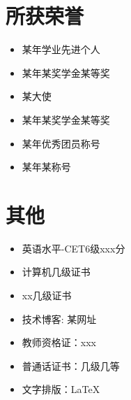 \documentclass[11pt]{article}
\begin{document}
    \section{\makebox[\widthof{\faStar}][c]{\color{NPU_Blue}{\faStar}}\quad 所获荣誉}
    \vspace{-1em}
    \begin{multicols}{2}
        \begin{itemize}
            \item 某年学业先进个人
            \item 某年某奖学金某等奖
            \item 某大使
            \item 某年某奖学金某等奖
            \item 某年优秀团员称号
            \item 某年某称号
        \end{itemize}
    \end{multicols}

    \section{\makebox[\widthof{\faInfo}][c]{\color{NPU_Blue}{\faInfo}}\quad 其他}
    \begin{itemize}
        \item 英语水平-CET6级xxx分
        \item 计算机几级证书
        \item xx几级证书
        \item 技术博客: 某网址
        \item 教师资格证：xxx
        \item 普通话证书：几级几等
        \item 文字排版：\LaTeX
    \end{itemize}
\end{document}
